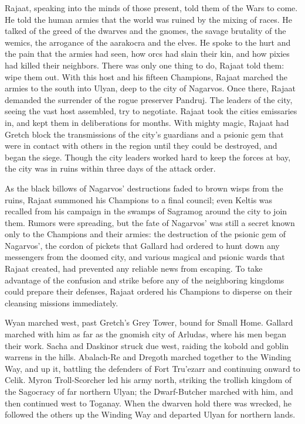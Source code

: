 Rajaat, speaking into the minds of those present, told them of the Wars to come. He told the human armies that the world was ruined by the mixing of races. He talked of the greed of the dwarves and the gnomes, the savage brutality of the wemics, the arrogance of the aarakocra and the elves. He spoke to the hurt and the pain that the armies had seen, how orcs had slain their kin, and how pixies had killed their neighbors. There was only one thing to do, Rajaat told them: wipe them out. With this host and his fifteen Champions, Rajaat marched the armies to the south into Ulyan, deep to the city of Nagarvos. Once there, Rajaat demanded the surrender of the rogue preserver Pandruj. The leaders of the city, seeing the vast host assembled, try to negotiate. Rajaat took the cities emissaries in, and kept them in deliberations for months. With mighty magic, Rajaat had Gretch block the transmissions of the city's guardians and a psionic gem that were in contact with others in the region until they could be destroyed, and began the siege. Though the city leaders worked hard to keep the forces at bay, the city was in ruins within three days of the attack order.

As the black billows of Nagarvos' destructions faded to brown wisps from the ruins, Rajaat summoned his Champions to a final council; even Keltis was recalled from his campaign in the swamps of Sagramog around the city to join them. Rumors were spreading, but the fate of Nagarvos' was still a secret known only to the Champions and their armies: the destruction of the psionic gem of Nagarvos', the cordon of pickets that Gallard had ordered to hunt down any messengers from the doomed city, and various magical and psionic wards that Rajaat created, had prevented any reliable news from escaping. To take advantage of the confusion and strike before any of the neighboring kingdoms could prepare their defenses, Rajaat ordered his Champions to disperse on their cleansing missions immediately.

Wyan marched west, past Gretch's Grey Tower, bound for Small Home. Gallard marched with him as far as the gnomish city of Arludas, where his men began their work. Sacha and Daskinor struck due west, raiding the kobold and goblin warrens in the hills. Abalach-Re and Dregoth marched together to the Winding Way, and up it, battling the defenders of Fort Tru'ezarr and continuing onward to Celik. Myron Troll-Scorcher led his army north, striking the trollish kingdom of the Sagocracy of far northern Ulyan; the Dwarf-Butcher marched with him, and then continued west to Toganay. When the dwarven hold there was wrecked, he followed the others up the Winding Way and departed Ulyan for northern lands.

